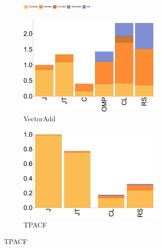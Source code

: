 \begin{figure}[ht]

  \begin{subfigure}[b]{\textwidth}
          \centering
          \includegraphics[width=0.4\textwidth]{data/legend.pdf}
  \end{subfigure}

  \begin{subfigure}[b]{0.3\textwidth}
      \includegraphics[width=0.8\textwidth]{data/bbattery_vectoradd_nexus7.pdf}
      \caption{VectorAdd}
  \end{subfigure}

  \begin{subfigure}[b]{0.3\textwidth}
      \includegraphics[width=0.8\textwidth]{data/bbattery_tpacf_nexus7.pdf}
      \caption{TPACF}
  \end{subfigure}


\end{figure}
